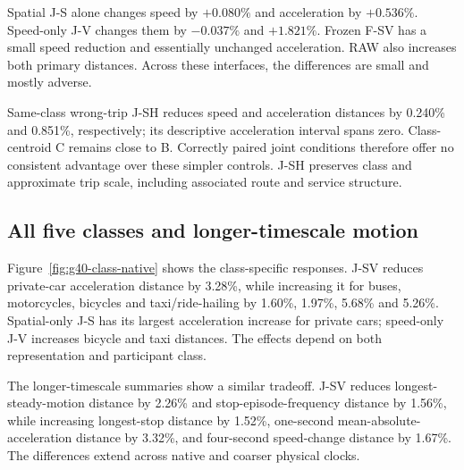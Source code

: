 

Spatial J-S alone changes speed by $+0.080\%$ and acceleration by $+0.536\%$. Speed-only J-V changes them by $-0.037\%$ and $+1.821\%$. Frozen F-SV has a small speed reduction and essentially unchanged acceleration. RAW also increases both primary distances. Across these interfaces, the differences are small and mostly adverse.

Same-class wrong-trip J-SH reduces speed and acceleration distances by 0.240\% and 0.851\%, respectively; its descriptive acceleration interval spans zero. Class-centroid C remains close to B. Correctly paired joint conditions therefore offer no consistent advantage over these simpler controls. J-SH preserves class and approximate trip scale, including associated route and service structure.

\subsection{All five classes and longer-timescale motion}
Figure~\ref{fig:g40-class-native} shows the class-specific responses. J-SV reduces private-car acceleration distance by 3.28\%, while increasing it for buses, motorcycles, bicycles and taxi/ride-hailing by 1.60\%, 1.97\%, 5.68\% and 5.26\%. Spatial-only J-S has its largest acceleration increase for private cars; speed-only J-V increases bicycle and taxi distances. The effects depend on both representation and participant class.


The longer-timescale summaries show a similar tradeoff. J-SV reduces longest-steady-motion distance by 2.26\% and stop-episode-frequency distance by 1.56\%, while increasing longest-stop distance by 1.52\%, one-second mean-absolute-acceleration distance by 3.32\%, and four-second speed-change distance by 1.67\%. The differences extend across native and coarser physical clocks.

